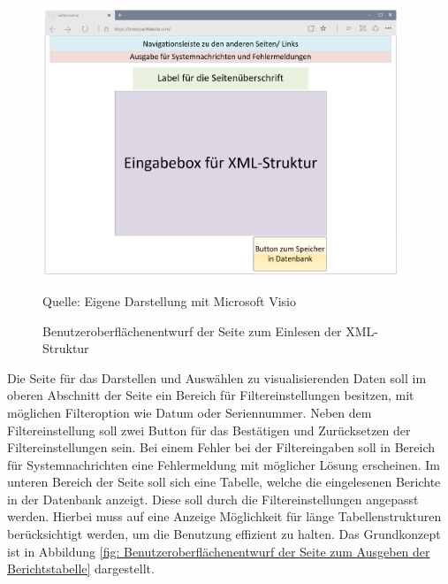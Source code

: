 \begin{figure}[H]
    \centering
    \includegraphics[width=0.95\textwidth]{Grafiken/Overlay_Einleseseite}
    \caption{Benutzeroberflächenentwurf der Seite zum Einlesen der XML-Struktur}
    \label{fig: Benutzeroberflächenentwurf der Seite zum Einlesen der XML-Struktur}
    {Quelle: Eigene Darstellung mit Microsoft Visio}
\end{figure}

Die Seite für das Darstellen und Auswählen zu visualisierenden Daten soll im oberen Abschnitt der Seite
ein Bereich für Filtereinstellungen besitzen, mit möglichen Filteroption wie Datum oder Seriennummer.
Neben dem Filtereinstellung soll zwei Button für das Bestätigen und Zurücksetzen der Filtereinstellungen
sein. Bei einem Fehler bei der Filtereingaben soll in Bereich für Systemnachrichten eine Fehlermeldung
mit möglicher Lösung erscheinen.
Im unteren Bereich der Seite soll sich eine Tabelle, welche die eingelesenen Berichte in der Datenbank
anzeigt. Diese soll durch die Filtereinstellungen angepasst werden. Hierbei muss auf eine Anzeige
Möglichkeit für länge Tabellenstrukturen berücksichtigt werden, um die Benutzung effizient zu halten. Das
Grundkonzept ist in Abbildung \ref{fig: Benutzeroberflächenentwurf der Seite zum Ausgeben der Berichtstabelle} dargestellt.


